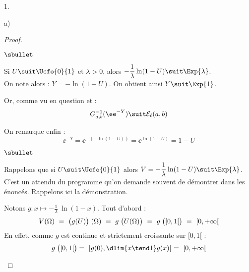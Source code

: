 \begin{noliste}{1.}
\begin{noliste}{a)}
    \begin{proof}~
      \begin{noliste}{$\sbullet$}
      \item Si $U \suit \Ucfo{0}{1}$ et $\lambda > 0$, alors $-
        \dfrac{1}{\lambda} \ln(1-U) \suit \Exp{\lambda}$.\\[.2cm]
        On note alors : $Y = - \ln(1-U)$. On obtient ainsi $Y \suit
        \Exp{1}$.

      \item Or, comme vu en question  et  :
        \[
        G^{-1}_{a, b}(\ee^{-Y}) \suit \mathcal{E}_\ell(a, b)
        \]

      \item On remarque enfin :
        \[
        \ee^{-Y} = \ee^{-(- \ln(1-U))} = \ee^{\ln(1-U)} = 1 - U
        \]       
      \end{noliste}
      
      
      \newpage
      
      
      \begin{remarkL}{.97}%
        \begin{noliste}{$\sbullet$}
        \item Rappelons que si $U \suit \Ucfo{0}{1}$ alors $V =
          -\dfrac{1}{\lambda} \ln(1-U) \suit \Exp{\lambda}$.\\
          C'est un attendu du programme qu'on demande souvent de
          démontrer dans les énoncés. Rappelons ici la démonstration.
        \item Notons $g : x \mapsto - \frac{1}{\lambda} \
          \ln(1-x)$. Tout d'abord :
          \[
          V(\Omega) \ = \ \big( g(U) \big) \hspace{.1cm} (\Omega)
          \ = \ g \hspace{.1cm} \big(U(\Omega) \big) \ = \ g
          \hspace{.1cm} \big( [0, 1[ \big) \ = \ [0, +\infty[
          \]
          En effet, comme $g$ est continue et strictement croissante
          sur $[0, 1[$ :
          \[
          g \hspace{.1cm} \big( [0, 1[ \big) = \ [g(0), \dlim{x \tend 1}
          g(x)[ \ = \ [0, +\infty[
          \]
          

\end{noliste}
\end{remarkL}
\end{proof}
\end{noliste}
\end{noliste}
